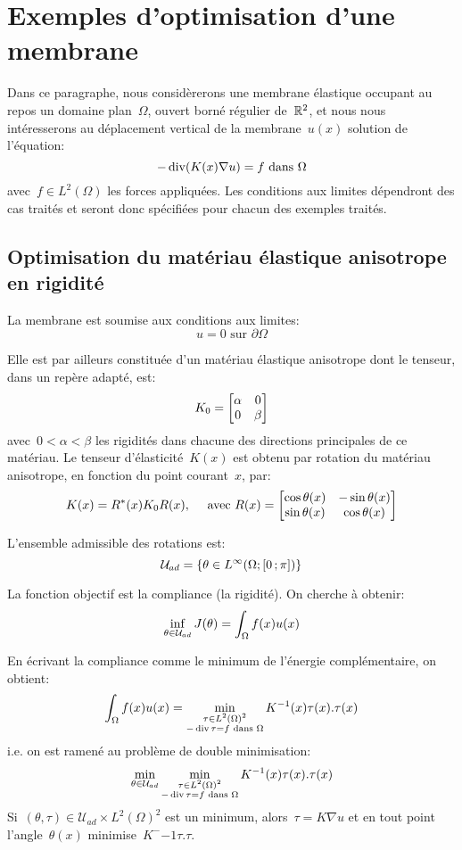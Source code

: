 \medskip
\section{Exemples d'optimisation d'une membrane}

Dans ce paragraphe, nous considèrerons une membrane élastique occupant au repos un domaine plan~$\Omega$, ouvert borné régulier de~$\mathbb R^2$, et nous nous intéresserons au déplacement vertical de la membrane~$u(x)$ solution de l'équation:
\begin{equation}\label{Eq-PbMembrane}
-\operatorname{div}(K(x)\nabla u) = f \text{ dans }\Omega
\end{equation}
avec~$f\in L^2(\Omega)$ les forces appliquées.
Les conditions aux limites dépendront des cas traités et seront donc spécifiées pour chacun des exemples traités.

\medskip
\subsection{Optimisation du matériau élastique anisotrope en rigidité}

La membrane est soumise aux conditions aux limites:
\[ u=0 \text{ sur }\partial\Omega \]

Elle est par ailleurs constituée d'un matériau élastique anisotrope dont le tenseur, dans un repère adapté, est:
\[ K_0 = \MM*{\alpha & 0\\0 &\beta} \]
avec~$0<\alpha<\beta$ les rigidités dans chacune des directions principales de ce matériau. Le tenseur d'élasticité~$K(x)$ est obtenu par rotation du matériau anisotrope, en fonction du point courant~$x$, par:
\[ K(x)=R^*(x)K_0R(x), \quad \text{ avec } R(x)=\MM*{\cos\theta(x) &-\sin\theta(x)\\ \sin\theta(x) & \cos\theta(x)} \]


L'ensemble admissible des rotations est:
\[ \mathcal{U}_{ad}=\{\theta\in L^\infty(\Omega;\mathopen{[}0\,;\pi\mathclose{]}) \} \]

\medskip
La fonction objectif est la compliance (la rigidité). On cherche à obtenir:
\[ \colorblue \inf_{\theta\in\mathcal{U}_{ad}} J(\theta)=\dint_\Omega f(x)u(x) \]

\medskip
En écrivant la compliance comme le minimum de l'énergie complémentaire, on obtient:
\[ \displaystyle\int_\Omega f(x)u(x) = \min_{\substack{\tau\in L^2(\Omega)^2\\ -\operatorname{div}\tau=f \text{ dans }\Omega}} K^{-1}(x)\tau(x).\tau(x) \]
i.e. on est ramené au problème de double minimisation:
\[ \min_{\theta\in\mathcal{U}_{ad}} \min_{\substack{\tau\in L^2(\Omega)^2\\ -\operatorname{div}\tau=f \text{ dans }\Omega}} K^{-1}(x)\tau(x).\tau(x)
\]
Si~$(\theta,\tau)\in\mathcal{U}_{ad}\times L^2(\Omega)^2$ est un minimum, alors~$\tau=K\nabla u$ et en tout point l'angle~$\theta(x)$ minimise~$K^-{-1}\tau.\tau$.

